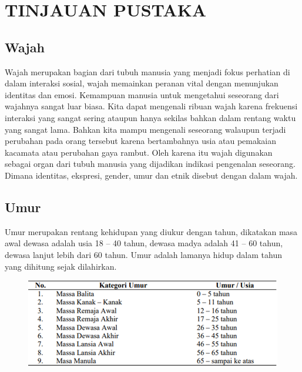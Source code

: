 \section{TINJAUAN PUSTAKA}

\subsection{Wajah}


Wajah merupakan bagian dari tubuh manusia yang menjadi fokus perhatian di dalam interaksi sosial, 
wajah memainkan peranan vital dengan menunjukan identitas dan emosi. Kemampuan manusia untuk mengetahui 
seseorang dari wajahnya sangat luar biasa. Kita dapat mengenali ribuan wajah karena frekuensi interaksi 
yang sangat sering ataupun hanya sekilas bahkan dalam rentang waktu yang sangat lama. Bahkan kita mampu 
mengenali seseorang walaupun terjadi perubahan pada orang tersebut karena bertambahnya usia atau 
pemakaian kacamata atau perubahan gaya rambut. Oleh karena itu wajah digunakan sebagai organ dari tubuh 
manusia yang dijadikan indikasi pengenalan seseorang. Dimana identitas, ekspresi, gender, umur dan etnik 
disebut dengan dalam wajah.

\subsection{Umur}
Umur merupakan rentang kehidupan yang diukur dengan tahun, dikatakan masa awal dewasa adalah usia 18 – 40 
tahun, dewasa madya adalah 41 – 60 tahun, dewasa lanjut lebih dari 60 tahun. Umur adalah lamanya hidup 
dalam tahun yang dihitung sejak dilahirkan\citep{MasaTubuh}.
\begin{figure} [H] \centering
    \includegraphics[scale=0.6]{gambar/umur.png}
    \label{fig:Umur}
\end{figure}

